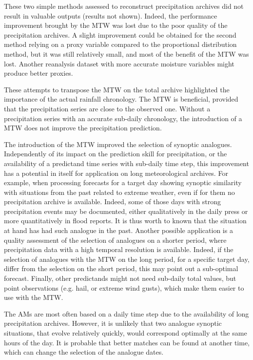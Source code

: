 \documentclass[hess, manuscript]{copernicus}
\begin{document}
	These two simple methods assessed to reconstruct precipitation archives did not result in valuable outputs (results not shown). Indeed, the performance improvement brought by the MTW was lost due to the poor quality of the precipitation archives. A slight improvement could be obtained for the second method relying on a proxy variable compared to the proportional distribution method, but it was still relatively small, and most of the benefit of the MTW was lost. Another reanalysis dataset with more accurate moisture variables might produce better proxies.
	
	These attempts to transpose the MTW on the total archive highlighted the importance of the actual rainfall chronology. The MTW is beneficial, provided that the precipitation series are close to the observed one. Without a precipitation series with an accurate sub-daily chronology, the introduction of a MTW does not improve the precipitation prediction.
	
	The introduction of the MTW improved the selection of synoptic analogues. Independently of its impact on the prediction skill for precipitation, or the availability of a predictand time series with sub-daily time step, this improvement has a potential in itself for application on long meteorological archives. For example, when processing forecasts for a target day showing synoptic similarity with situations from the past related to extreme weather, even if for them no precipitation archive is available. Indeed, some of those days with strong precipitation events may be documented, either qualitatively in the daily press or more quantitatively in flood reports. It is thus worth to known that the situation at hand has had such analogue in the past. Another possible application is a quality assessment of the selection of analogues on a shorter period, where precipitation data with a high temporal resolution is available. Indeed, if the selection of analogues with the MTW on the long period, for a specific target day, differ from the selection on the short period, this may point out a sub-optimal forecast. Finally, other predictands might not need sub-daily total values, but point observations (e.g. hail, or extreme wind gusts), which make them easier to use with the MTW.
	
	
	\conclusions  %
	\label{sec:conclusions}
	
	The AMs are most often based on a daily time step due to the availability of long precipitation archives. However, it is unlikely that two analogue synoptic situations, that evolve relatively quickly, would correspond optimally at the same hours of the day. It is probable that better matches can be found at another time, which can change the selection of the analogue dates.
	
\end{document}
